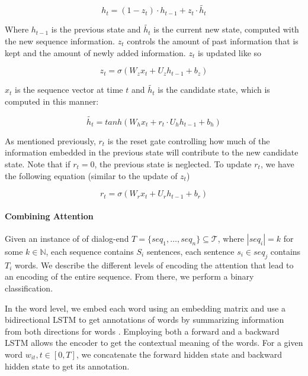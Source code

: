 \begin{equation*}
	h_t = (1-z_t)\cdot h_{t-1} + z_t \cdot \widetilde{h_t}
\end{equation*}

Where $h_{t-1}$ is the previous state and $\widetilde{h_t}$ 
is the current new state, computed with the new sequence information. 
$z_t$ controls the amount of past information that is kept 
and the amount of newly added information. $z_t$ is updated like so

\begin{equation*}
	z_t = \sigma(W_z x_t + U_z h_{t-1} + b_z)
\end{equation*}

$x_t$ is the sequence vector at time $t$ and 
$\widetilde{h_t}$ is the candidate state, which is 
computed in this manner: 

\begin{equation*}
	\widetilde{h_t} = tanh(W_h x_t + r_t \cdot U_h h_{t-1} + b_h)
\end{equation*}

As mentioned previously, $r_t$ is the reset gate 
controlling how much of the information embedded in 
the previous state will contribute to the new candidate state. 
Note that if $r_t = 0$, the previous state is neglected. 
To update $r_t$, we have the following equation (similar to the update of $z_t$)

\begin{equation*}
	r_t = \sigma(W_r x_t + U_r h_{t-1} + b_r)
\end{equation*}

\paragraph*{Combining Attention}
Given an instance of of dialog-end $T=\{seq_1, \ldots, seq_n\} \subseteq \mathcal{T}$, where $|seq_i| = k$ for some $k \in \mathbb{N}$, each sequence contains $S_i$ sentences, each sentence $s_i \in seq_j$ contains $T_i$ words. 
We describe the different levels of encoding the attention that lead 
to an encoding of the entire sequence. From there, we perform 
a binary classification. 

In the word level, we embed each word using an embedding matrix \cite{glove} 
and use a bidirectional LSTM 
to get annotations of words by summarizing information
from both directions for words \cite{attention}. 
Employing both a forward and a backward LSTM 
allows the encoder to get the contextual meaning of the words. 
For a given word $w_{it}, t\in [0,T]$, 
we concatenate the forward hidden state and
backward hidden state to get its annotation. 

